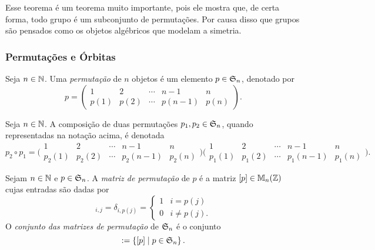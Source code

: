 	Esse teorema é um teorema muito importante, pois ele mostra que, de certa forma, todo grupo é um subconjunto de permutações. Por causa disso que grupos são pensados como os objetos algébricos que modelam a simetria.

\subsubsection{Permutações e Órbitas}

\begin{defi} Seja $n \in \mathbb{N}$. Uma \emph{permutação} de $n$ objetos é um elemento $p \in \mathfrak{S}_n$, denotado por
	\begin{equation*}
	p = \begin{pmatrix}
				1 & 2 & \cdots & n-1 & n \\
				p(1) & p(2) & \cdots &  p(n-1)  & p(n)
			\end{pmatrix}.
	\end{equation*}
\end{defi}

\begin{nota}
	Seja $n \in \mathbb{N}$. A composição de duas permutações $p_1,p_2 \in \mathfrak{S}_n$, quando representadas na notação acima, é denotada
	\begin{equation*}
	p_2 \circ p_1 = \bigl(\begin{smallmatrix}
				1 & 2 & \cdots & n-1 & n \\
				p_2(1) & p_2(2) & \cdots &  p_2(n-1)  & p_2(n)
			\end{smallmatrix}\bigr)
			\bigl(\begin{smallmatrix}
				1 & 2 & \cdots & n-1 & n \\
				p_1(1) & p_1(2) & \cdots &  p_1(n-1)  & p_1(n)
			\end{smallmatrix}\bigr).
	\end{equation*}
\end{nota}

\begin{defi}
	Sejam $n \in \mathbb{N}$ e $p \in \mathfrak{S}_n$. A \emph{matriz de permutação} de $p$ é a matriz $[p] \in \mathbb{M}_n (\mathbb{Z})$ cujas entradas são dadas por
	\begin{equation*}
		[p]_{i,j} = \delta_{i,p(j)} = \begin{cases}
												1 & i=p(j) \\
												0 & i \neq p(j).
												\end{cases}
	\end{equation*}
	O \emph{conjunto das matrizes de permutação} de $\mathfrak{S}_n$ é o conjunto
	\begin{equation*}
		[\sime_n] := \set{[p]}{p \in \sime_n}.
	\end{equation*}
\end{defi}

